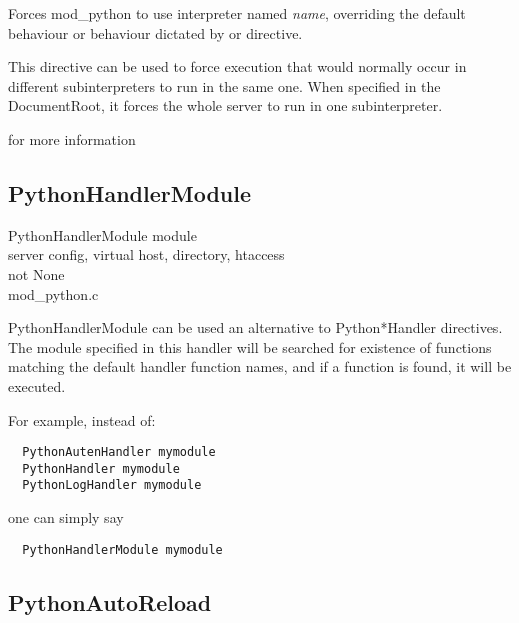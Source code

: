 Forces mod_python to use interpreter named \emph{name}, overriding the
default behaviour or behaviour dictated by
 or
 directive.

This directive can be used to force execution that would normally
occur in different subinterpreters to run in the same one. When
specified in the DocumentRoot, it forces the whole server to run in one
subinterpreter.

\begin{seealso}
           {for more information}
\end{seealso}

\subsection{PythonHandlerModule\label{dir-other-phm}}

PythonHandlerModule module \\
server config, virtual host, directory, htaccess\\
not None\\
mod_python.c

PythonHandlerModule can be used an alternative to Python*Handler
directives. The module specified in this handler will be searched for
existence of functions matching the default handler function names,
and if a function is found, it will be executed.

For example, instead of:
\begin{verbatim}
  PythonAutenHandler mymodule
  PythonHandler mymodule
  PythonLogHandler mymodule
\end{verbatim}    

one can simply say
\begin{verbatim}
  PythonHandlerModule mymodule
\end{verbatim}    

\subsection{PythonAutoReload\label{dir-other-par}}

